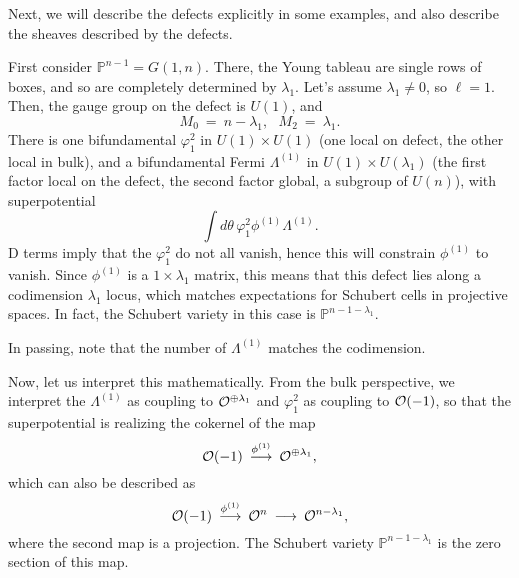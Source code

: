 \documentclass[12pt]{article}
\begin{document}
Next, we will describe the defects explicitly in some examples,
and also describe the sheaves described by the defects.

First consider ${\mathbb P}^{n-1} = G(1,n)$.
There, the Young tableau are single rows of boxes,
and so are completely determined by $\lambda_1$.
Let's assume $\lambda_1 \neq 0$, so $\ell = 1$.
Then, the gauge group on the defect is $U(1)$,
and
\begin{equation}
M_0 \: = \: n - \lambda_1, \: \: \: M_2 \: = \: \lambda_1.
\end{equation}
There is one bifundamental $\varphi_1^2$ in $U(1) \times U(1)$
(one local on defect, the other local in bulk),
and a bifundamental Fermi $\Lambda^{(1)}$ in $U(1) \times U(\lambda_1)$
(the first factor local on the defect, the second factor global, a subgroup of
$U(n)$), with superpotential
\begin{equation}
\int d\theta \, \varphi_1^2 \phi^{(1)} \Lambda^{(1)}.
\end{equation}
D terms imply that the $\varphi_1^2$ do not all vanish,
hence this will constrain $\phi^{(1)}$ to vanish.
Since $\phi^{(1)}$ is a $1 \times \lambda_1$ matrix,
this means that this defect lies along a codimension $\lambda_1$ locus,
which matches expectations for Schubert cells in projective spaces.
In fact, the Schubert variety in this case is ${\mathbb P}^{n-1-\lambda_1}$.

In passing, note that the number of $\Lambda^{(1)}$ matches the
codimension.

Now, let us interpret this mathematically.
From the bulk perspective, we interpret the $\Lambda^{(1)}$ as coupling to
${\cal O}^{\oplus \lambda_1}$ and $\varphi_1^2$ as coupling to ${\cal O}(-1)$,
so that the superpotential is realizing the cokernel of the map
\begin{equation}
{\cal O}(-1) \: \stackrel{\phi^{(1)}}{\longrightarrow} \:
{\cal O}^{\oplus \lambda_1},
\end{equation}
which can also be described as
\begin{equation}
{\cal O}(-1) \: \stackrel{\phi^{(1)}}{\longrightarrow} \:
{\cal O}^{n} \: \longrightarrow \: {\cal O}^{n - \lambda_1},
\end{equation}
where the second map is a projection.
The Schubert variety ${\mathbb P}^{n-1-\lambda_1}$ is the zero section 
of this map.
\end{document}
